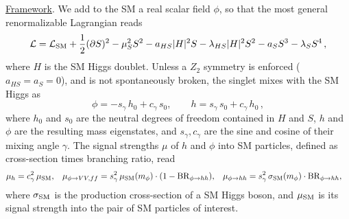\label{sec:singlets_general}

\underline{Framework}. We add to the SM a real scalar field $\phi$, so that the most general renormalizable Lagrangian reads \begin{equation}
\mathcal{L} = \mathcal{L}_{\rm SM} + \frac{1}{2}(\partial S)^2  - \mu_S^2 S^2 - a_{HS} |H|^2S- \lambda_{HS} |H|^2S^2- a_S S^3 - \lambda_S S^4\,,
\end{equation}
where $H$ is the SM Higgs doublet. 
Unless a $Z_2$ symmetry is enforced ($a_{HS} = a_S = 0$), and is not spontaneously broken, the singlet mixes with the SM Higgs as
\begin{equation}
\phi = -s_\gamma\,h_0 + c_\gamma\,s_0, \qquad h = s_\gamma\,s_0 + c_\gamma\,h_0\,,
\end{equation}
where $h_0$ and $s_0$ are the neutral \cpeven degrees of freedom contained in $H$ and $S$, $h$ and $\phi$ are the resulting mass eigenstates, and $s_\gamma, c_\gamma$ are the sine and cosine of their mixing angle $\gamma$. The signal strengths $\mu$ of $h$ and $\phi$ into SM particles, defined as cross-section times branching ratio, read
%
\begin{align}
\mu_h &= c_\gamma^2 \, \mu_{\rm SM}, &
\mu_{\phi \to VV, ff} &= s_\gamma^2 \,\mu_{\rm SM} (m_\phi)\cdot (1 - {\rm BR}_{\phi \to hh}), &
\mu_{\phi \to hh} &= s_\gamma^2 \, \sigma_{\rm SM} (m_\phi)\cdot {\rm BR}_{\phi \to hh},
\end{align}
where $\sigma_{\rm SM}$ is the production cross-section of a SM Higgs boson, and $\mu_{\rm SM}$ is its signal strength into the pair of SM particles of interest.

